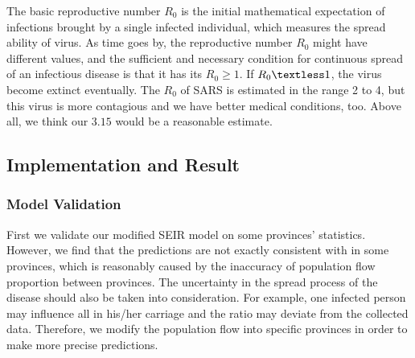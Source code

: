 \documentclass[12pt]{mcmthesis}
\begin{document}
The basic reproductive number $R_0$ is the initial mathematical expectation of infections brought by a single infected individual, which measures the spread ability of virus. As time goes by, the reproductive number $R_0$ might have different values, and the sufficient and necessary condition for continuous spread of an infectious disease is that it has its $R_0 \geq 1$. If $R_0 \textless 1$, the virus become extinct eventually. The $R_0$ of SARS is estimated in the range 2 to 4, but this virus is more contagious and we have better medical conditions, too. Above all, we think our $3.15$ would be a reasonable estimate.

\subsection{Implementation and Result}

\subsubsection{Model Validation}
First we validate our modified SEIR model on some provinces' statistics. However, we find that the predictions are not exactly consistent with in some provinces, which is reasonably caused by the inaccuracy of population flow proportion between provinces. The uncertainty in the spread process of the disease should also be taken into consideration. For example, one infected person may influence all in his/her carriage and the ratio may deviate from the collected data. Therefore, we modify the population flow into specific provinces in order to make more precise predictions. 
\end{document}
